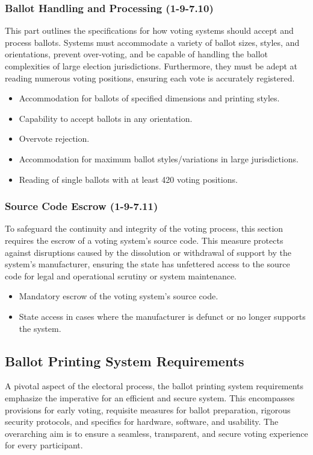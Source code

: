 \documentclass{article}
\begin{document}
\subsubsection{Ballot Handling and Processing (1-9-7.10)}
This part outlines the specifications for how voting systems should accept and process ballots. Systems must accommodate a variety of ballot sizes, styles, and orientations, prevent over-voting, and be capable of handling the ballot complexities of large election jurisdictions. Furthermore, they must be adept at reading numerous voting positions, ensuring each vote is accurately registered.

\begin{itemize}
    \item Accommodation for ballots of specified dimensions and printing styles.
    \item Capability to accept ballots in any orientation.
    \item Overvote rejection.
    \item Accommodation for maximum ballot styles/variations in large jurisdictions.
    \item Reading of single ballots with at least 420 voting positions.
\end{itemize}

\subsubsection{Source Code Escrow (1-9-7.11)}
To safeguard the continuity and integrity of the voting process, this section requires the escrow of a voting system's source code. This measure protects against disruptions caused by the dissolution or withdrawal of support by the system's manufacturer, ensuring the state has unfettered access to the source code for legal and operational scrutiny or system maintenance.

\begin{itemize}
    \item Mandatory escrow of the voting system's source code.
    \item State access in cases where the manufacturer is defunct or no longer supports the system.
\end{itemize}

\subsection{Ballot Printing System Requirements}
A pivotal aspect of the electoral process, the ballot printing system requirements emphasize the imperative for an efficient and secure system. This encompasses provisions for early voting, requisite measures for ballot preparation, rigorous security protocols, and specifics for hardware, software, and usability. The overarching aim is to ensure a seamless, transparent, and secure voting experience for every participant.
\end{document}
